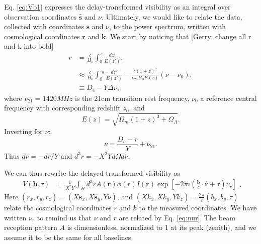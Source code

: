 \documentclass[preprint2,numberedappendix,tighten,twocolappendix]{aastex6}  %
\renewcommand\[{\begin{equation}}
\renewcommand\]{\end{equation}}
\begin{document}
Eq. \eqref{eq:Vb1} expresses the delay-transformed visibility as
an integral over observation coordinates $\hat{\boldsymbol{s}}$ and $\nu$. Ultimately,
we would like to relate the data, collected with coordinates $\hat{\boldsymbol{s}}$
and $\nu$, to the power spectrum, written with cosmological coordinates
$\boldsymbol{r}$ and $\boldsymbol{k}$. We start by noticing that
{[}Gerry: change all r and k into bold{]} 
\[
\begin{aligned}r & =\frac{c}{H_{0}}\int_{0}^{z}\frac{dz'}{E(z')},\\
 & \approx\frac{c}{H_{0}}\int_{0}^{z_{0}}\frac{dz'}{E(z')}-\frac{c(1+z)^{2}}{\nu_{21}H_{0}E(z)}\left(\nu-\nu_{0}\right),\\
 & \equiv D_{c}-Y\Delta\nu,
\end{aligned}
\]
where $\nu_{21}=1420MHz$ is the 21cm transition rest frequency, $\nu_{0}$
a reference central frequency with corresponding redshift $z_{0}$,
and 
\[
E(z)=\sqrt{\Omega_{m}(1+z)^{3}+\Omega_{\Lambda}}.
\]
Inverting for $\nu$:
\begin{equation}
\nu=\frac{D_{c}-r}{Y}+\nu_{21}.\label{eq:nur}
\end{equation}
Thus $d\nu=-dr/Y$ and $d^{3}r=-X^{2}Yd\Omega d\nu$. 

We can thus rewrite the delayed transformed visibility as 
\small
\[
\begin{aligned}V(\boldsymbol{b},\tau) & =\frac{1}{X^{2}Y}\int_{H}d^{3}rA(\boldsymbol{r})\phi(r)I(\boldsymbol{r})\exp\left[-2\pi i\left(\frac{\boldsymbol{b}}{c}\cdot\hat{\boldsymbol{r}}+\tau\right)\nu_{r}\right]\end{aligned}.
\]
\normalsize
Here $(r_{x},r_{y},r_{z})=(X\hat{\boldsymbol{s}}_{x},X\hat{\boldsymbol{s}}_{y},Y\nu)$, and
$(Xk_{x},Xk_{y},Yk_{z})=\frac{2\pi}{c}(b_{x},b_{y},\tau)$ relate
the cosmological coordinates $r$ and $k$ to the measured coordinates.
We have written $\nu_{r}$ to remind us that $\nu$ and $r$ are related
by Eq. \eqref{eq:nur}. The beam reception pattern $A$ is dimensionless,
normalized to 1 at its peak (zenith), and we assume it to be the same
for all baselines. 
\end{document}
